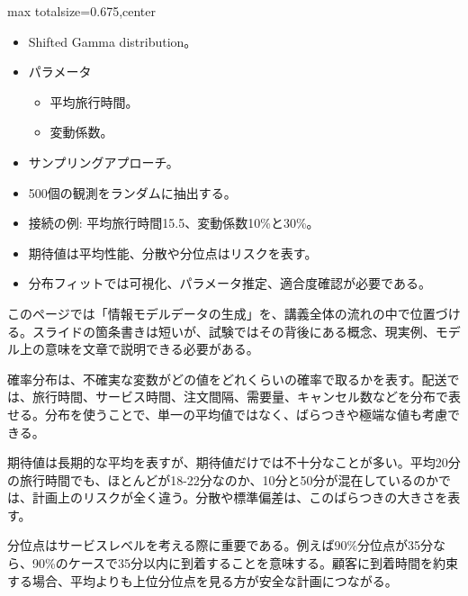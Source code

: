 \clearpage
{}
\begin{adjustbox}{max totalsize={\textwidth}{0.675\textheight},center}
\begin{minipage}{\textwidth}\scriptsize
\begin{minipage}[t]{0.485\textwidth}
\begin{itemize}
\item Shifted Gamma distribution。
\item パラメータ
\begin{itemize}
\item 平均旅行時間。
\item 変動係数。
\end{itemize}
\item サンプリングアプローチ。
\item 500個の観測をランダムに抽出する。
\item 接続の例: 平均旅行時間15.5、変動係数10\%と30\%。
\end{itemize}
\begin{itemize}
\item 期待値は平均性能、分散や分位点はリスクを表す。
\item 分布フィットでは可視化、パラメータ推定、適合度確認が必要である。
\end{itemize}
\end{minipage}\hfill
\begin{minipage}[t]{0.485\textwidth}
このページでは「情報モデルデータの生成」を、講義全体の流れの中で位置づける。スライドの箇条書きは短いが、試験ではその背後にある概念、現実例、モデル上の意味を文章で説明できる必要がある。\par
確率分布は、不確実な変数がどの値をどれくらいの確率で取るかを表す。配送では、旅行時間、サービス時間、注文間隔、需要量、キャンセル数などを分布で表せる。分布を使うことで、単一の平均値ではなく、ばらつきや極端な値も考慮できる。\par
期待値は長期的な平均を表すが、期待値だけでは不十分なことが多い。平均20分の旅行時間でも、ほとんどが18-22分なのか、10分と50分が混在しているのかでは、計画上のリスクが全く違う。分散や標準偏差は、このばらつきの大きさを表す。\par
分位点はサービスレベルを考える際に重要である。例えば90\%分位点が35分なら、90\%のケースで35分以内に到着することを意味する。顧客に到着時間を約束する場合、平均よりも上位分位点を見る方が安全な計画につながる。\par

\end{minipage}
\end{minipage}
\end{adjustbox}
